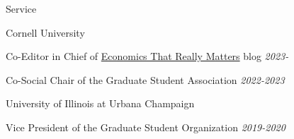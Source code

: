 \documentclass{resume} %
\begin{document}
\begin{rSection}{Service}

\begin{rSubsection}{Cornell University}{}{}{}
\item Co-Editor in Chief of \href{https://www.econthatmatters.com/}{Economics That Really Matters} blog \hfill \textit{2023-}
\item Co-Social Chair of the Graduate Student Association \hfill \textit{2022-2023}

\end{rSubsection}

\begin{rSubsection}{University of Illinois at Urbana Champaign}{}{}{}
\item Vice President of the Graduate Student Organization \hfill \textit{2019-2020}
\end{rSubsection}

\end{rSection}
\end{document}
